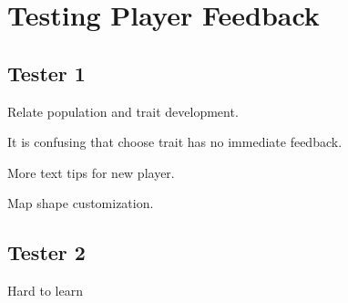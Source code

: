 \section{Testing Player Feedback}

\subsection{Tester 1}
Relate population and trait development.

It is confusing that choose trait has no immediate feedback.

More text tips for new player.

Map shape customization.

\subsection{Tester 2}
Hard to learn